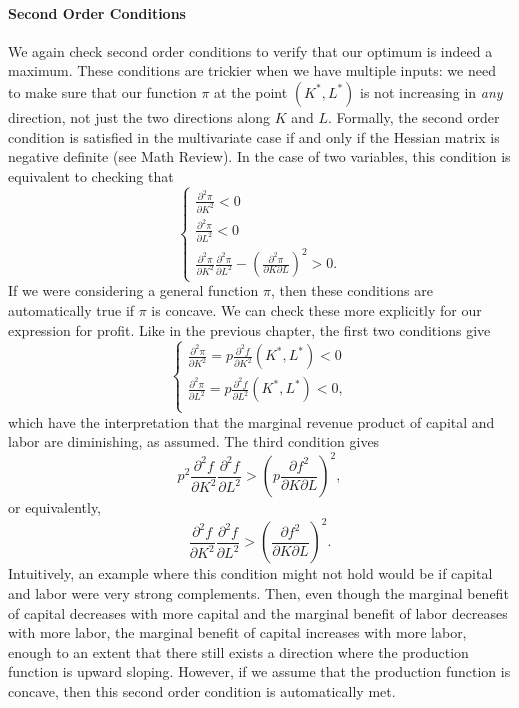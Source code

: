 \paragraph{Second Order Conditions}

We again check second order conditions to verify that our optimum is indeed a maximum. These conditions are trickier when we have multiple inputs: we need to make sure that our function $\pi$ at the point $(K^*, L^*)$ is not increasing in \textit{any} direction, not just the two directions along $K$ and $L$. Formally, the second order condition is satisfied in the multivariate case if and only if the Hessian matrix is negative definite (see Math Review). In the case of two variables, this condition is equivalent to checking that
$$\begin{cases}
\frac{\partial^2\pi}{\partial K^2} < 0 \\
\frac{\partial^2\pi}{\partial L^2} < 0 \\
\frac{\partial^2\pi}{\partial K^2}\frac{\partial^2\pi}{\partial L^2} - \left(\frac{\partial^2\pi}{\partial K\partial L}\right)^2 > 0.
\end{cases}$$
If we were considering a general function $\pi$, then these conditions are automatically true if $\pi$ is concave. We can check these more explicitly for our expression for profit. Like in the previous chapter, the first two conditions give
$$\begin{cases}
\frac{\partial^2\pi}{\partial K^2} = p\frac{\partial^2f}{\partial K^2}(K^*, L^*) < 0 \\
\frac{\partial^2\pi}{\partial L^2} = p\frac{\partial^2f}{\partial L^2}(K^*, L^*) < 0, \\
\end{cases}$$
which have the interpretation that the marginal revenue product of capital and labor are diminishing, as assumed. The third condition gives
$$p^2\frac{\partial^2 f}{\partial K^2}\frac{\partial^2 f}{\partial L^2} > \left(p \frac{\partial f^2}{\partial K \partial L}\right)^2,$$
or equivalently,
$$\frac{\partial^2 f}{\partial K^2}\frac{\partial^2 f}{\partial L^2} > \left(\frac{\partial f^2}{\partial K \partial L}\right)^2.$$
Intuitively, an example where this condition might not hold would be if capital and labor were very strong complements. Then, even though the marginal benefit of capital decreases with more capital and the marginal benefit of labor decreases with more labor, the marginal benefit of capital increases with more labor, enough to an extent that there still exists a direction where the production function is upward sloping. However, if we assume that the production function is concave, then this second order condition is automatically met.

